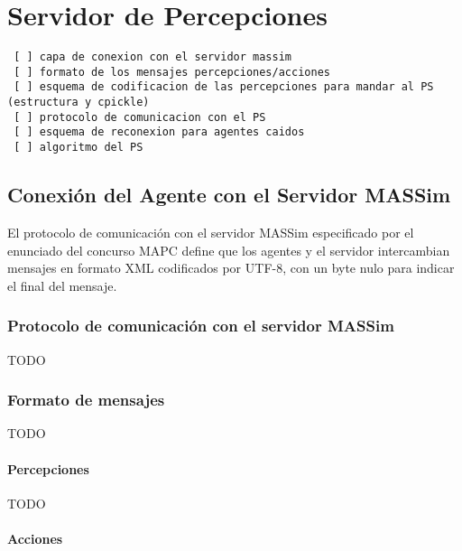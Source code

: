 
\chapter{Servidor de Percepciones}
\label{chap:servidor_de_percepciones}

 \begin{verbatim}
 [ ] capa de conexion con el servidor massim
 [ ] formato de los mensajes percepciones/acciones
 [ ] esquema de codificacion de las percepciones para mandar al PS (estructura y cpickle)
 [ ] protocolo de comunicacion con el PS
 [ ] esquema de reconexion para agentes caidos
 [ ] algoritmo del PS
 \end{verbatim}

\section{Conexión del Agente con el Servidor MASSim}
\label{sec:conexion_massim}

 El protocolo de comunicación con el servidor MASSim especificado por 
 el enunciado del concurso MAPC define que los agentes y el servidor 
 intercambian mensajes en formato XML codificados por UTF-8, con un 
 byte nulo para indicar el final del mensaje. 

\subsection{Protocolo de comunicación con el servidor MASSim}
\label{sub:protocolo_massim}

 TODO

\subsection{Formato de mensajes}
\label{sub:formato_mensajes}

 TODO

\subsubsection{Percepciones}
\label{subsub:percepciones}

 TODO

\subsubsection{Acciones}

